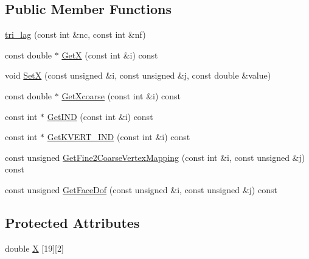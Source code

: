 \subsection*{Public Member Functions}
\begin{DoxyCompactItemize}
\item 
\mbox{\hyperlink{classfemus_1_1tri__lag_a6a6eb55649360448493f953402f5d178}{tri\+\_\+lag}} (const int \&nc, const int \&nf)
\item 
const double $\ast$ \mbox{\hyperlink{classfemus_1_1tri__lag_adbc5aaa467d849777aa97a6339dd2c4d}{GetX}} (const int \&i) const
\item 
void \mbox{\hyperlink{classfemus_1_1tri__lag_aa031dd1be0ccbd6ebdb8d57b3a28d374}{SetX}} (const unsigned \&i, const unsigned \&j, const double \&value)
\item 
const double $\ast$ \mbox{\hyperlink{classfemus_1_1tri__lag_a93b897c5080dee5a7415a85735f96330}{Get\+Xcoarse}} (const int \&i) const
\item 
const int $\ast$ \mbox{\hyperlink{classfemus_1_1tri__lag_a4418a7f1b7f2402a647232e7d42b1ce0}{Get\+I\+ND}} (const int \&i) const
\item 
const int $\ast$ \mbox{\hyperlink{classfemus_1_1tri__lag_a16e3ec116476466d968402ba961917b4}{Get\+K\+V\+E\+R\+T\+\_\+\+I\+ND}} (const int \&i) const
\item 
const unsigned \mbox{\hyperlink{classfemus_1_1tri__lag_a884d403e16a7d3bb459809ef8e07a74c}{Get\+Fine2\+Coarse\+Vertex\+Mapping}} (const int \&i, const unsigned \&j) const
\item 
const unsigned \mbox{\hyperlink{classfemus_1_1tri__lag_a1f53bf1823d6a1f1e593dc25df0fecc1}{Get\+Face\+Dof}} (const unsigned \&i, const unsigned \&j) const
\end{DoxyCompactItemize}
\subsection*{Protected Attributes}
\begin{DoxyCompactItemize}
\item 
double \mbox{\hyperlink{classfemus_1_1tri__lag_ac33e58cbc73fa2adf667faae68fa8246}{X}} \mbox{[}19\mbox{]}\mbox{[}2\mbox{]}
\end{DoxyCompactItemize}
